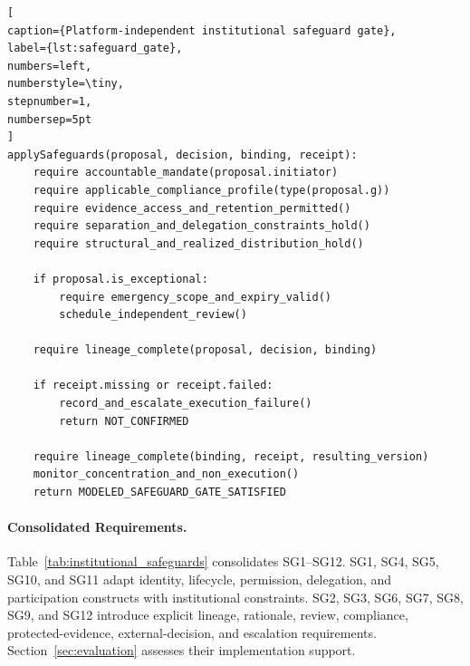 \documentclass[journal]{IEEEtran}
\begin{document}
\begin{lstlisting}[
caption={Platform-independent institutional safeguard gate},
label={lst:safeguard_gate},
numbers=left,
numberstyle=\tiny,
stepnumber=1,
numbersep=5pt
]
applySafeguards(proposal, decision, binding, receipt):
    require accountable_mandate(proposal.initiator)
    require applicable_compliance_profile(type(proposal.g))
    require evidence_access_and_retention_permitted()
    require separation_and_delegation_constraints_hold()
    require structural_and_realized_distribution_hold()

    if proposal.is_exceptional:
        require emergency_scope_and_expiry_valid()
        schedule_independent_review()

    require lineage_complete(proposal, decision, binding)

    if receipt.missing or receipt.failed:
        record_and_escalate_execution_failure()
        return NOT_CONFIRMED

    require lineage_complete(binding, receipt, resulting_version)
    monitor_concentration_and_non_execution()
    return MODELED_SAFEGUARD_GATE_SATISFIED
\end{lstlisting}

\paragraph{Consolidated Requirements.}

Table~\ref{tab:institutional_safeguards} consolidates SG1--SG12.
SG1, SG4, SG5, SG10, and SG11 adapt identity, lifecycle,
permission, delegation, and participation constructs with
institutional constraints. SG2, SG3, SG6, SG7, SG8, SG9,
and SG12 introduce explicit lineage, rationale, review,
compliance, protected-evidence, external-decision, and
escalation requirements. Section~\ref{sec:evaluation}
assesses their implementation support.
\end{document}
